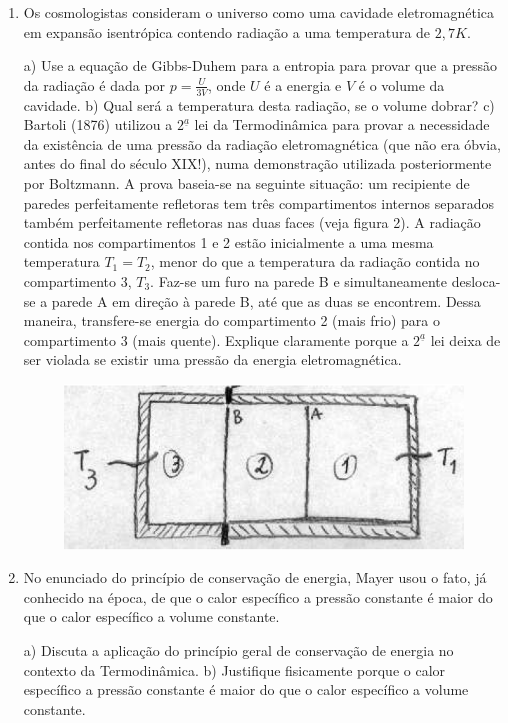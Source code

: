 \begin{enumerate}[start=1,label={\bfseries Q\arabic*.}]
\item Os cosmologistas consideram o universo como uma cavidade eletromagnética em expansão isentrópica contendo radiação a uma temperatura de $2,7 K$.

  a) Use a equação de Gibbs-Duhem para a entropia para provar que a pressão da radiação é dada por $p = \frac{U}{3V}$, onde $U$ é a energia e $V$ é o volume da cavidade.
  b) Qual será a temperatura desta radiação, se o volume dobrar?
  c) Bartoli (1876) utilizou a $2^{\underline{a}}$ lei da Termodinâmica para provar a necessidade da existência de uma pressão da radiação eletromagnética (que não era óbvia, antes do final do século XIX!), numa demonstração utilizada posteriormente por Boltzmann. A prova baseia-se na seguinte situação: um recipiente de paredes perfeitamente refletoras tem três compartimentos internos separados também perfeitamente refletoras nas duas faces (veja figura 2). A radiação contida nos compartimentos 1 e 2 estão inicialmente a uma mesma temperatura $T_{1} = T_{2}$, menor do que a temperatura da radiação contida no compartimento 3, $T_{3}$. Faz-se um furo na parede B e simultaneamente desloca-se a parede A em direção à parede B, até que as duas se encontrem. Dessa maneira, transfere-se energia do compartimento 2 (mais frio) para o compartimento 3 (mais quente). Explique claramente porque a $2^{\underline{a}}$ lei deixa de ser violada se existir uma pressão da energia eletromagnética.
      \begin{figure}[H]
  \centering
  \includegraphics[scale=0.8]{termica-img/pressaoradiacao.png}
\end{figure}



\item No enunciado do princípio de conservação de energia, Mayer usou o fato, já conhecido na época, de que o calor específico a pressão constante é maior do que o calor específico a volume constante.

  a) Discuta a aplicação do princípio geral de conservação de energia no contexto da Termodinâmica.
  b) Justifique fisicamente porque o calor específico a pressão constante é maior do que o calor específico a volume constante.




\end{enumerate}
